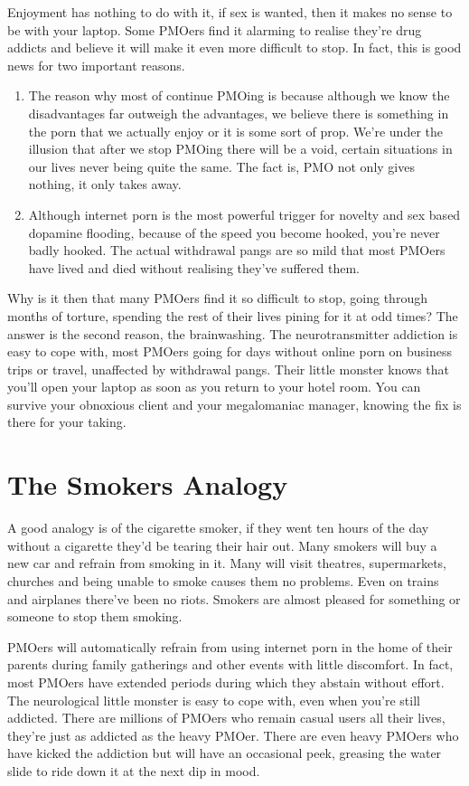 \documentclass[easypeasy.tex]{subfiles}
\begin{document}
Enjoyment has nothing to do with it, if sex is wanted, then it makes no sense to be with your laptop. Some PMOers find it alarming to realise they're drug addicts and believe it will make it even more difficult to stop. In fact, this is good news for two important reasons.
    \begin{enumerate}
      \item The reason why most of continue PMOing is because although we know the disadvantages far outweigh the advantages, we believe there is something in the porn that we actually enjoy or it is some sort of prop. We're under the illusion that after we stop PMOing there will be a void, certain situations in our lives never being quite the same. The fact is, PMO not only gives nothing, it only takes away.

      \item Although internet porn is the most powerful trigger for novelty and sex based dopamine flooding, because of the speed you become hooked, you're never badly hooked. The actual withdrawal pangs are so mild that most PMOers have lived and died without realising they've suffered them.
    \end{enumerate}

Why is it then that many PMOers find it so difficult to stop, going through months of torture, spending the rest of their lives pining for it at odd times? The answer is the second reason, the brainwashing. The neurotransmitter addiction is easy to cope with, most PMOers going for days without online porn on business trips or travel, unaffected by withdrawal pangs. Their little monster knows that you'll open your laptop as soon as you return to your hotel room. You can survive your obnoxious client and your megalomaniac manager, knowing the fix is there for your taking.

\section{The Smokers Analogy}
A good analogy is of the cigarette smoker, if they went ten hours of the day without a cigarette they'd be tearing their hair out. Many smokers will buy a new car and refrain from smoking in it. Many will visit theatres, supermarkets, churches and being unable to smoke causes them no problems. Even on trains and airplanes there've been no riots. Smokers are almost pleased for something or someone to stop them smoking.

PMOers will automatically refrain from using internet porn in the home of their parents during family gatherings and other events with little discomfort. In fact, most PMOers have extended periods during which they abstain without effort. The neurological little monster is easy to cope with, even when you're still addicted. There are millions of PMOers who remain casual users all their lives, they're just as addicted as the heavy PMOer. There are even heavy PMOers who have kicked the addiction but will have an occasional peek, greasing the water slide to ride down it at the next dip in mood.
\end{document}
